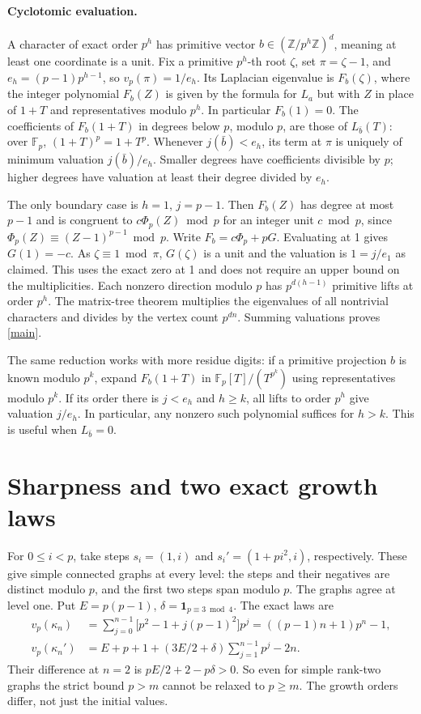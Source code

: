 \documentclass[11pt]{article}
\newcommand{\F}{\mathbb F}
\newcommand{\Z}{\mathbb Z}
\newcommand{\val}{v_p}
\begin{document}
\paragraph{Cyclotomic evaluation.}
A character of exact order \(p^h\) has primitive vector
\(b\in(\Z/p^h\Z)^d\), meaning at least one coordinate is a unit.
Fix a primitive \(p^h\)-th root \(\zeta\), set \(\pi=\zeta-1\), and
\(e_h=(p-1)p^{h-1}\), so \(\val(\pi)=1/e_h\).
Its Laplacian eigenvalue is \(F_b(\zeta)\), where the integer polynomial
\(F_b(Z)\) is given by the formula for \(L_a\) but with \(Z\) in place of
\(1+T\) and representatives modulo \(p^h\).
In particular \(F_b(1)=0\).
\newpage
The coefficients of \(F_b(1+T)\) in degrees below \(p\), modulo \(p\), are
those of \(L_{\bar b}(T)\): over \(\F_p\), \((1+T)^p=1+T^p\).
Whenever \(j(\bar b)<e_h\), its term at \(\pi\) is uniquely of minimum
valuation \(j(\bar b)/e_h\). Smaller degrees have coefficients divisible
by \(p\); higher degrees have valuation at least their degree divided
by \(e_h\).

The only boundary case is \(h=1\), \(j=p-1\).
Then \(F_b(Z)\) has degree at most \(p-1\) and is congruent to
\(c\Phi_p(Z)\bmod p\) for an integer unit \(c\bmod p\), since
\(\Phi_p(Z)\equiv(Z-1)^{p-1}\bmod p\).
Write \(F_b=c\Phi_p+pG\). Evaluating at 1 gives \(G(1)=-c\).
As \(\zeta\equiv1\bmod\pi\), \(G(\zeta)\) is a unit and the valuation is
\(1=j/e_1\) as claimed. This uses the exact zero at 1 and does not require
an upper bound on the multiplicities. Each nonzero direction modulo \(p\)
has \(p^{d(h-1)}\) primitive lifts at order \(p^h\). The matrix-tree
theorem multiplies the eigenvalues of all nontrivial characters and
divides by the vertex count \(p^{dn}\). Summing valuations proves
\eqref{main}.

The same reduction works with more residue digits: if a primitive
projection \(b\) is known modulo \(p^k\), expand \(F_b(1+T)\) in
\(\F_p[T]/(T^{p^k})\) using representatives modulo \(p^k\).
If its order there is \(j<e_h\) and \(h\ge k\), all lifts to order
\(p^h\) give valuation \(j/e_h\). In particular, any nonzero such
polynomial suffices for \(h>k\). This is useful when \(L_{\bar b}=0\).

\section{Sharpness and two exact growth laws}
For \(0\le i<p\), take steps \(s_i=(1,i)\) and \(s_i'=(1+pi^2,i)\),
respectively. These give simple connected graphs at every level:
the steps and their negatives are distinct modulo \(p\), and
the first two steps span modulo \(p\). The graphs agree at level one.
Put \(E=p(p-1)\), \(\delta=\mathbf 1_{p\equiv3\bmod4}\). The exact laws
are
\begin{align}
 \val(\kappa_n)&=\sum_{j=0}^{n-1}
        \big[p^2-1+j(p-1)^2\big]p^j=((p-1)n+1)p^n-1, \label{flat}\\
 \val(\kappa_n')&=E+p+1+(3E/2+\delta)\sum_{j=1}^{n-1}p^j-2n. \label{curved}
\end{align}
Their difference at \(n=2\) is \(pE/2+2-p\delta>0\). So even for simple
rank-two graphs the strict bound \(p>m\) cannot be relaxed to \(p\ge m\).
The growth orders differ, not just the initial values.
\end{document}
